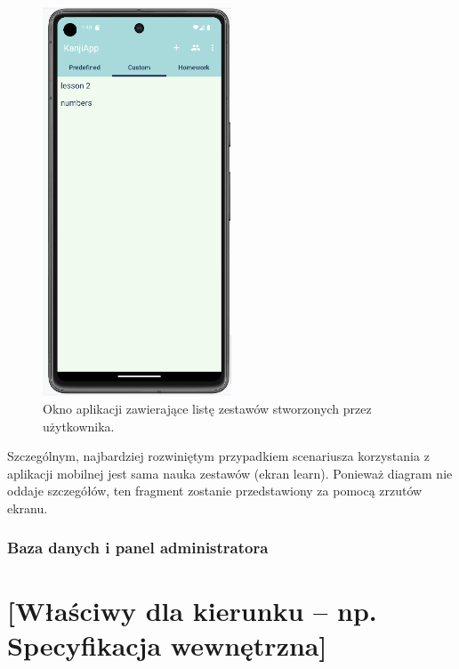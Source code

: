 \documentclass[a4paper,twoside,12pt]{book}
\begin{document}
\begin{figure}[]
\centering
\includegraphics[width=0.5\textwidth]{catlist}
\caption{Okno aplikacji zawierające listę zestawów stworzonych przez użytkownika.}
\label{fig:catlist}
\end{figure}

Szczególnym, najbardziej rozwiniętym przypadkiem scenariusza korzystania z aplikacji mobilnej jest sama nauka zestawów (ekran learn). Ponieważ diagram nie oddaje szczegółów, ten fragment zostanie przedstawiony za pomocą zrzutów ekranu.




\subsection{Baza danych i panel administratora}


\chapter{[Właściwy dla kierunku -- np. Specyfikacja wewnętrzna]}
\label{ch:05}

\end{document}
